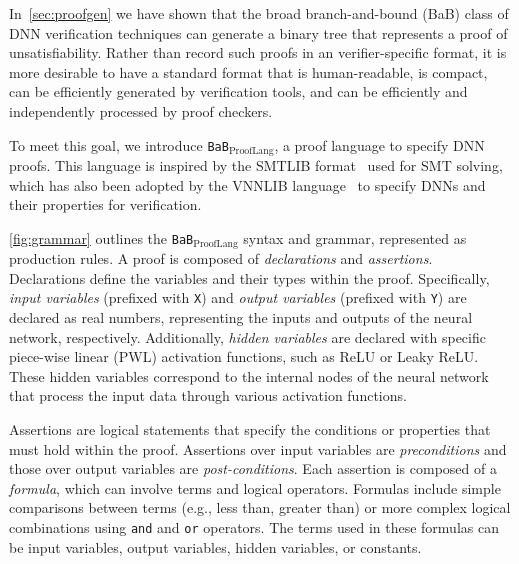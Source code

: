 \documentclass[oneside,11pt,dvipsnames]{book}
\numberwithin{equation}{section}
\theoremstyle{definition}
\theoremstyle{remark}
\newcommand{\functiontextformat}[1]{\textrm{\texttt{#1}}}
\newcommand{\prooflang}{\texttt{BaB$_{\text{ProofLang}}$}}
\begin{document}
In~\autoref{sec:proofgen} we have shown that the broad branch-and-bound (BaB) class of DNN verification techniques  can generate a binary tree that represents a proof of unsatisfiability.
Rather than record such proofs in an verifier-specific format, it is more desirable to have a standard format
that is human-readable, is compact, can be efficiently generated by verification tools, and can
be efficiently and independently processed by proof checkers.  

To meet this goal, we introduce \prooflang{}, a proof language to specify DNN proofs.
This language is inspired by the SMTLIB format~\cite{barrett2010smt} used for SMT solving, which has also been adopted by the  VNNLIB language~\cite{vnnlib} to specify DNNs and their properties for  verification.


\autoref{fig:grammar} outlines the \prooflang{} syntax and grammar, represented as production rules. 
A proof is composed of \textit{declarations} and \textit{assertions}. Declarations define the variables and their types within the proof. Specifically, \textit{input variables} (prefixed with \functiontextformat{X}) and \textit{output variables} (prefixed with \functiontextformat{Y}) are declared as real numbers, representing the inputs and outputs of the neural network, respectively. Additionally, \textit{hidden variables} are declared with specific piece-wise linear (PWL) activation functions, such as ReLU or Leaky ReLU. These hidden variables correspond to the internal nodes of the neural network that process the input data through various activation functions.

Assertions are logical statements that specify the conditions or properties that must hold within the proof. Assertions over input variables are \emph{preconditions} and those over output variables are \emph{post-conditions}. Each assertion is composed of a \textit{formula}, which can involve terms and logical operators. Formulas include simple comparisons between terms (e.g., less than, greater than) or more complex logical combinations using \functiontextformat{and} and \functiontextformat{or} operators. The terms used in these formulas can be input variables, output variables, hidden variables, or constants.
\end{document}
